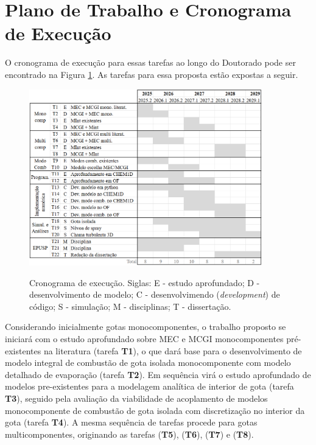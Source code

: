 \section{Plano de Trabalho e Cronograma de Execução}

O cronograma de execução para essas tarefas ao longo do Doutorado pode ser encontrado na Figura \ref{fig:cronograma}.
As tarefas para essa proposta estão expostas a seguir.

\begin{figure}[ht]
    \centering
    \caption{Cronograma de execução. Siglas: E - estudo aprofundado; D - desenvolvimento de modelo; C - desenvolvimendo (\emph{development}) de código; S - simulação; M - disciplinas; T - dissertação.}
    \includegraphics[width=0.9\textwidth]{30_images/cronograma-3.png}
    \label{fig:cronograma}
\end{figure}


Considerando inicialmente gotas monocomponentes, o trabalho proposto se iniciará com o estudo aprofundado sobre MEC e MCGI monocomponentes pré-existentes na literatura (tarefa \textbf{T1}), o que dará base para o desenvolvimento de modelo integral de combustão de gota isolada monocomponente com modelo detalhado de evaporação (tarefa \textbf{T2}).
Em sequência virá o estudo aprofundado de modelos pre-existentes para a modelagem analítica de  interior de gota (tarefa \textbf{T3}), seguido pela avaliação da viabilidade de acoplamento de modelos monocomponente de combustão de gota isolada com discretização no interior da gota (tarefa \textbf{T4}).
A mesma sequência de tarefas procede para gotas multicomponentes, originando as tarefas (\textbf{T5}), (\textbf{T6}), (\textbf{T7}) e (\textbf{T8}). 

